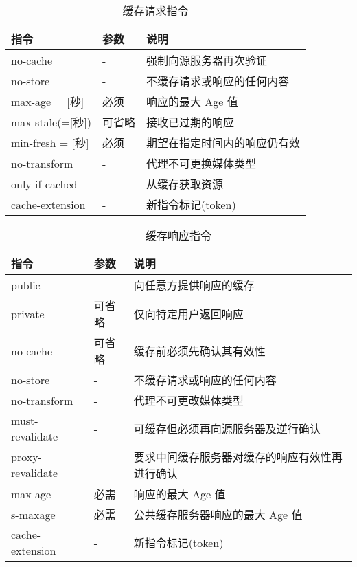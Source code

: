 \begin{table}[H]
    \centering
    \caption{缓存请求指令}
    \label{table:缓存请求指令}
    \setlength{\tabcolsep}{4mm}
    \begin{tabular}{l|l|l}
        \toprule
        \textbf{指令} & \textbf{参数} & \textbf{说明} \\
        \midrule
        no-cache & - & 强制向源服务器再次验证 \\
        no-store & - & 不缓存请求或响应的任何内容 \\
        max-age = [秒] & 必须 & 响应的最大 Age 值 \\
        max-stale(=[秒]) & 可省略 & 接收已过期的响应 \\
        min-fresh = [秒] & 必须 & 期望在指定时间内的响应仍有效 \\
        no-transform & - & 代理不可更换媒体类型 \\
        only-if-cached & - & 从缓存获取资源 \\
        cache-extension & - & 新指令标记(token) \\
        \bottomrule
    \end{tabular}
\end{table}

\begin{table}[H]
    \centering
    \caption{缓存响应指令}
    \label{table:缓存响应指令}
    \setlength{\tabcolsep}{4mm}
    \begin{tabular}{l|l|l}
        \toprule
        \textbf{指令} & \textbf{参数} & \textbf{说明} \\
        \midrule
        public & - & 向任意方提供响应的缓存 \\
        private & 可省略 & 仅向特定用户返回响应 \\
        no-cache & 可省略 & 缓存前必须先确认其有效性 \\
        no-store & - & 不缓存请求或响应的任何内容 \\
        no-transform & - & 代理不可更改媒体类型 \\
        must-revalidate & - & 可缓存但必须再向源服务器及逆行确认 \\
        proxy-revalidate & - & 要求中间缓存服务器对缓存的响应有效性再进行确认 \\
        max-age & 必需 & 响应的最大 Age 值 \\
        s-maxage & 必需 & 公共缓存服务器响应的最大 Age 值 \\
        cache-extension & - & 新指令标记(token) \\
        \bottomrule
    \end{tabular}
\end{table}


